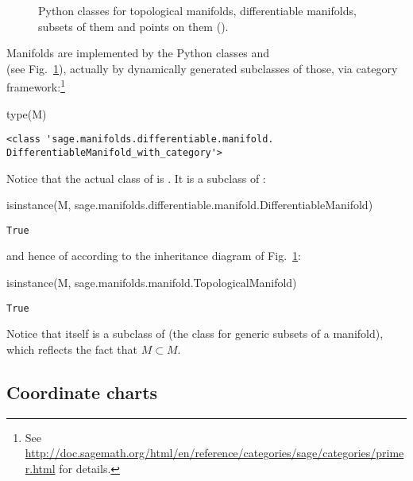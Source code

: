 \begin{figure}
\begin{center}

\end{center}
\caption{\label{f:man:domain_classes}\footnotesize
Python classes for topological
manifolds, differentiable manifolds, subsets of them
and points on them ().}
\end{figure}


Manifolds are implemented by the Python classes 
and \\  (see Fig.~\ref{f:man:domain_classes}),
actually by dynamically generated subclasses of those, via \Sage{} category
framework:\footnote{See \url{http://doc.sagemath.org/html/en/reference/categories/sage/categories/primer.html} for details.}
\begin{NBin}
type(M)
\end{NBin}
\begin{NBout}
\begin{verbatim}
<class 'sage.manifolds.differentiable.manifold.
DifferentiableManifold_with_category'>
\end{verbatim}
\end{NBout}
Notice that the actual class of  is .
It is a subclass of :
\begin{NBin}
isinstance(M,
   sage.manifolds.differentiable.manifold.DifferentiableManifold)
\end{NBin}
\begin{NBout}
\texttt{True}
\end{NBout}
and hence of
 according to the inheritance diagram of Fig.~\ref{f:man:domain_classes}:
\begin{NBin}
isinstance(M, sage.manifolds.manifold.TopologicalManifold)
\end{NBin}
\begin{NBout}
\texttt{True}
\end{NBout}
Notice that  itself is a subclass of  (the class
for generic subsets of a manifold), which reflects the fact that $M\subset M$.

\subsection{Coordinate charts} \label{s:man:coord_chart}

